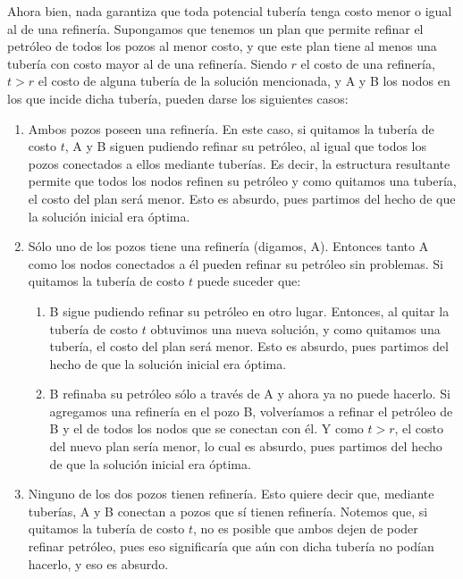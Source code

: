 Ahora bien, nada garantiza que toda potencial tubería tenga costo menor o igual al de una refinería. Supongamos que tenemos un plan que permite refinar el petróleo de todos los pozos al menor costo, y que este plan tiene al menos una tubería con costo mayor al de una refinería. Siendo $r$ el costo de una refinería, $t > r$ el costo de alguna tubería de la solución mencionada, y A y B los nodos en los que incide dicha tubería, pueden darse los siguientes casos:

\begin{enumerate}
	\item Ambos pozos poseen una refinería. En este caso, si quitamos la tubería de costo $t$, A y B siguen pudiendo refinar su petróleo, al igual que todos los pozos conectados a ellos mediante tuberías. Es decir, la estructura resultante permite que todos los nodos refinen su petróleo y como quitamos una tubería, el costo del plan será menor.  Esto es absurdo, pues partimos del hecho de que la solución inicial era óptima.
	\item Sólo uno de los pozos tiene una refinería (digamos, A). Entonces tanto A como los nodos conectados a él pueden refinar su petróleo sin problemas. Si quitamos la tubería de costo $t$ puede suceder que:
	
	\begin{enumerate}
		\item B sigue pudiendo refinar su petróleo en otro lugar.  Entonces, al quitar la tubería de costo $t$ obtuvimos una nueva solución, y como quitamos una tubería, el costo del plan será menor.  Esto es absurdo, pues partimos del hecho de que la solución inicial era óptima.
		\item B refinaba su petróleo sólo a través de A y ahora ya no puede hacerlo. Si agregamos una refinería en el pozo B, volveríamos a refinar el petróleo de B y el de todos los nodos que se conectan con él. Y como $t > r$, el costo del nuevo plan sería menor, lo cual es absurdo, pues partimos del hecho de que la solución inicial era óptima.
	\end{enumerate}
	
	\item Ninguno de los dos pozos tienen refinería. Esto quiere decir que, mediante tuberías, A y B conectan a pozos que sí tienen refinería. Notemos que, si quitamos la tubería de costo $t$, no es posible que ambos dejen de poder refinar petróleo, pues eso significaría que aún con dicha tubería no podían hacerlo, y eso es absurdo.
	

\end{enumerate}
